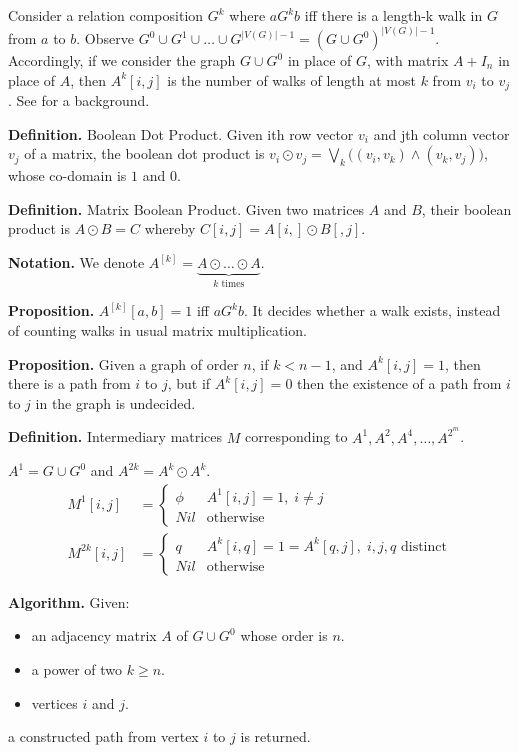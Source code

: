 Consider a relation composition $G^k$ where $a G^k b$ iff there is a length-k walk in $G$ from $a$ to $b$. Observe $G^0 \cup G^1 \cup \dots \cup G^{|V(G)|-1} = (G \cup G^0)^{|V(G)|-1}$. Accordingly, if we consider the graph $G \cup G^0$ in place of $G$, with matrix $A + I_n$ in place of $A$, then $A^k[i,j]$ is the number of walks of length at most $k$ from $v_i$ to $v_j$. See \cite{discreteHandbook} for a background.

\textbf{Definition.} Boolean Dot Product. Given ith row vector $v_i$ and jth column vector $v_j$ of a matrix, the boolean dot product is $v_i \odot v_j = \bigvee_k \big ( (v_i, v_k) \wedge (v_k, v_j) \big )$, whose co-domain is $1$ and $0$.

\textbf{Definition.} Matrix Boolean Product. Given two matrices $A$ and $B$, their boolean product is $A \odot B = C$ whereby $C[i,j] = A[i,] \odot B[,j]$.

\textbf{Notation.} We denote $A^{[k]} = \underbrace{A \odot \dots \odot A}_{k \text{ times}}$.

\textbf{Proposition.} $A^{[k]}[a,b] = 1$ iff $a G^k b$. It decides whether a walk exists, instead of counting walks in usual matrix multiplication.

\textbf{Proposition.} Given a graph of order $n$, if $k < n-1$, and $A^k[i,j] = 1$, then there is a path from $i$ to $j$, but if $A^k[i,j] = 0$ then the existence of a path from $i$ to $j$ in the graph is undecided.

\textbf{Definition.} Intermediary matrices $M$ corresponding to $A^1, A^2, A^4, \dots, A^{2^m}$.

$A^1 = G \cup G^0$ and $A^{2k} = A^k \odot A^k$.
\begin{align*}
M^1[i,j] &= \begin{cases} 
      \phi & A^1[i,j]=1, \; i \neq j \\
      Nil & \text{otherwise}
    \end{cases} \\
M^{2k}[i,j] &= \begin{cases} 
      q & A^k[i,q] = 1 = A^k[q,j], \; i,j,q \text{ distinct} \\
      Nil & \text{otherwise}
    \end{cases}
\end{align*}

\textbf{Algorithm.} Given:
\begin{itemize}
  \item an adjacency matrix $A$ of $G \cup G^0$ whose order is $n$.
  \item a power of two $k \geq n$.
  \item vertices $i$ and $j$.
\end{itemize}
a constructed path from vertex $i$ to $j$ is returned.

